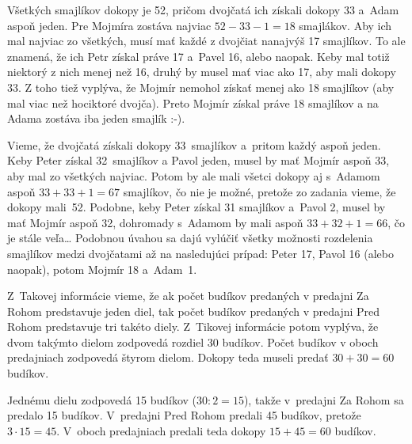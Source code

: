 {%
Všetkých smajlíkov dokopy je 52, pričom dvojčatá ich získali dokopy 33 a~Adam aspoň jeden.
Pre Mojmíra zostáva najviac $52-33-1 =18$ smajlákov. Aby ich mal najviac zo všetkých,
musí mať každé z dvojčiat nanajvýš 17 smajlíkov.
To ale znamená, že ich Petr získal práve  17 a~Pavel 16, alebo naopak.
Keby mal totiž niektorý z nich menej než 16, druhý by musel mať viac ako 17, aby mali dokopy 33.
Z toho tiež vyplýva, že Mojmír nemohol získať menej ako 18 smajlíkov (aby mal viac než hociktoré
dvojča).
Preto Mojmír získal práve 18 smajlíkov a na Adama zostáva iba jeden smajlík :-).

\ineriesenie
Vieme, že dvojčatá získali dokopy 33~smajlíkov a~pritom každý aspoň jeden.
Keby Peter získal 32~smajlíkov a Pavol jeden, musel by mať Mojmír aspoň 33, aby mal
zo všetkých najviac.
Potom by ale mali všetci dokopy aj s~Adamom aspoň ${33+33+1}=67$ smajlíkov,
čo nie je možné, pretože zo zadania vieme, že dokopy mali~52.
Podobne, keby Peter získal 31 smajlíkov a~Pavol 2, musel by mať Mojmír aspoň 32, dohromady s~Adamom by
mali aspoň $33+32+1=66$, čo je stále veľa\dots{}
Podobnou úvahou sa dajú vylúčiť všetky možnosti rozdelenia smajlíkov medzi
dvojčatami až na nasledujúci prípad:
Peter 17, Pavol 16 (alebo naopak), potom Mojmír 18 a~Adam~1.
}

{%
Z~Takovej informácie vieme, že ak počet budíkov predaných v predajni Za Rohom predstavuje
jeden diel, tak počet budíkov predaných v predajni Pred Rohom predstavuje
tri takéto diely.
Z~Tikovej informácie potom vyplýva, že dvom takýmto dielom zodpovedá rozdiel 30 budíkov.
Počet budíkov v oboch predajniach zodpovedá štyrom dielom. Dokopy teda museli predať
$30+30=60$ budíkov.

\poznamka
Jednému dielu zodpovedá 15 budíkov ($30 : 2 = 15$), takže v~predajni Za Rohom sa predalo 15 budíkov. V~predajni
Pred Rohom predali 45 budíkov, pretože $3\cdot 15=45$.
V~oboch predajniach predali teda dokopy $15 + 45 = 60$ budíkov.
}

